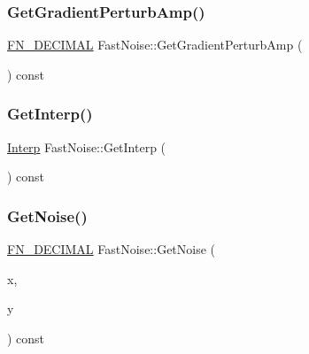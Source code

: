 \subsubsection{\texorpdfstring{Get\+Gradient\+Perturb\+Amp()}{GetGradientPerturbAmp()}}
{\footnotesize\ttfamily \mbox{\hyperlink{_fast_noise_8h_a75a9ef6d2541c4921815b885bfd449c3}{F\+N\+\_\+\+D\+E\+C\+I\+M\+AL}} Fast\+Noise\+::\+Get\+Gradient\+Perturb\+Amp (\begin{DoxyParamCaption}{ }\end{DoxyParamCaption}) const\hspace{0.3cm}{\ttfamily [inline]}}

\mbox{\label{class_fast_noise_ab7cd259a2864b29a824deaf3c67a3b75}} 
\subsubsection{\texorpdfstring{Get\+Interp()}{GetInterp()}}
{\footnotesize\ttfamily \mbox{\hyperlink{class_fast_noise_a60969f626ea3ea3504ea51d789f19a33}{Interp}} Fast\+Noise\+::\+Get\+Interp (\begin{DoxyParamCaption}{ }\end{DoxyParamCaption}) const\hspace{0.3cm}{\ttfamily [inline]}}

\mbox{\label{class_fast_noise_a61722acaa5692a40ee939d578b6a40d1}} 
\subsubsection{\texorpdfstring{Get\+Noise()}{GetNoise()}\hspace{0.1cm}{\footnotesize\ttfamily [1/2]}}
{\footnotesize\ttfamily \mbox{\hyperlink{_fast_noise_8h_a75a9ef6d2541c4921815b885bfd449c3}{F\+N\+\_\+\+D\+E\+C\+I\+M\+AL}} Fast\+Noise\+::\+Get\+Noise (\begin{DoxyParamCaption}\item[{\mbox{\hyperlink{_fast_noise_8h_a75a9ef6d2541c4921815b885bfd449c3}{F\+N\+\_\+\+D\+E\+C\+I\+M\+AL}}}]{x,  }\item[{\mbox{\hyperlink{_fast_noise_8h_a75a9ef6d2541c4921815b885bfd449c3}{F\+N\+\_\+\+D\+E\+C\+I\+M\+AL}}}]{y }\end{DoxyParamCaption}) const}

